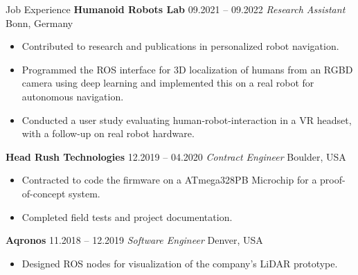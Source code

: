 \begin{rubric}{Job Experience}
%
%
\entry*[] \textbf{Humanoid Robots Lab} \hfill 09.2021 -- 09.2022 \newline
 \textit{Research Assistant} \hfill Bonn, Germany \newline 
\vspace{\CVItemizeHeaderSpacing} \begin{itemize}[leftmargin=*, rightmargin=1cm]
	\setlength{\itemsep}{\CVItemizeSpacing}
	\item Contributed to research and publications in personalized robot navigation.
	\item Programmed the ROS interface for 3D localization of humans from an RGBD camera using deep learning and implemented this on a real robot for autonomous navigation.
	\item Conducted a user study evaluating human-robot-interaction in a VR headset, with a follow-up on real robot hardware.
\end{itemize}
%
%
\entry*[] \textbf{Head Rush Technologies} \hfill 12.2019 -- 04.2020 \newline
 \textit{Contract Engineer} \hfill Boulder, USA \newline 
\vspace{\CVItemizeHeaderSpacing} \begin{itemize}[leftmargin=*, rightmargin=1cm]
	\setlength{\itemsep}{\CVItemizeSpacing}
	\item Contracted to code the firmware on a ATmega328PB Microchip for a proof-of-concept system.  
	\item Completed field tests and project documentation.  
\end{itemize}
%
\entry*[] \textbf{Aqronos} \hfill 11.2018 -- 12.2019 \newline
\textit{Software Engineer} \hfill Denver, USA \newline
\vspace{\CVItemizeHeaderSpacing} \begin{itemize}[leftmargin=*, rightmargin=1cm]
	\setlength{\itemsep}{\CVItemizeSpacing}
	\item Designed ROS nodes for visualization of the company's LiDAR prototype.  

\end{itemize}
\end{rubric}
